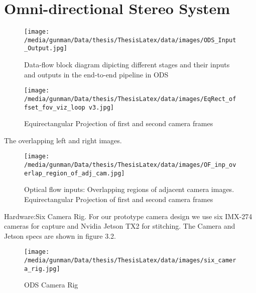 \section{Omni-directional Stereo System}
\begin{figure}[h]
	\begin{center}
		\texttt{[image: /media/gunman/Data/thesis/ThesisLatex/data/images/ODS\_Input\_Output.jpg]}
		\caption{Data-flow block diagram dipicting different stages and their inputs and outputs in the end-to-end pipeline in ODS}
		\label{ODS_Input_Output}
	\end{center}
	\vspace{-0.3in}
\end{figure} 

\begin{figure*}
	\begin{center}
		\texttt{[image: /media/gunman/Data/thesis/ThesisLatex/data/images/EqRect\_offset\_fov\_viz\_loop v3.jpg]}
		\caption{Equirectangular Projection of first and second camera frames}
		\label{ODS_Input_Ouput}
	\end{center}
	\vspace{-0.3in}
\end{figure*} 

The overlapping left and right images.
\begin{figure*}
	\begin{center}
		\texttt{[image: /media/gunman/Data/thesis/ThesisLatex/data/images/OF\_inp\_overlap\_region\_of\_adj\_cam.jpg]}
		\caption{Optical flow inputs: Overlapping regions of adjacent camera images. Equirectangular Projection of first and second camera frames}
		\label{ODS_Input_Ouput}
	\end{center}
	\vspace{-0.3in}
\end{figure*} 

Hardware:Six Camera Rig.
For our prototype camera design we use six IMX-274 cameras for capture and Nvidia Jetson TX2 for stitching. The Camera and Jetson specs are shown in figure 3.2. \newline 
\begin{figure}[h]
	\begin{center}
		\texttt{[image: /media/gunman/Data/thesis/ThesisLatex/data/images/six\_camera\_rig.jpg]}
		\caption{ODS Camera Rig}
		\label{ODS_Input_Output}
	\end{center}
	\vspace{-0.3in}
\end{figure} 

